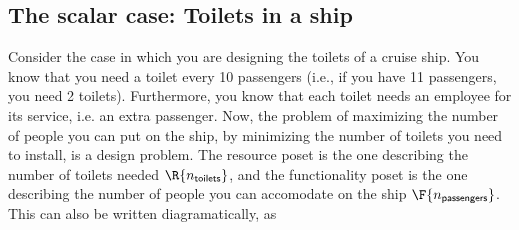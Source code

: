 \subsection{The scalar case: Toilets in a ship}
Consider the case in which you are designing the toilets of a cruise ship. You know that you need a toilet every 10 passengers (i.e., if you have 11 passengers, you need 2 toilets). Furthermore, you know that each toilet needs an employee for its service, i.e. an extra passenger. Now, the problem of maximizing the number of people you can put on the ship, by minimizing the number of toilets you need to install, is a design problem. The resource poset is the one describing the number of toilets needed $\R{n_\mathsf{toilets}}$, and the functionality poset is the one describing the number of people you can accomodate on the ship $\F{n_\mathsf{passengers}}$.
This can also be written diagramatically, as
\begin{center}
\end{center}

